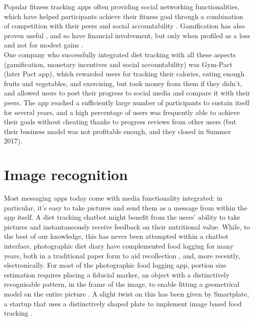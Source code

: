 Popular fitness tracking apps often providing social networking functionalities, which have helped participants achieve their fitness goal through a combination of competition with their peers and social accountability \cite{chenchen2014}. Gamification has also proven useful \cite{doi:10.1001/jamainternmed.2017.3458}, and so have financial involvement, but only when profiled as a loss and not for modest gains \cite{doi:10.7326/M15-1635}. \\
One company who successfully integrated diet tracking with all these aspects (gamification, monetary incentives and social accountability) was Gym-Pact (later Pact app), which rewarded users for tracking their calories, eating enough fruits and vegetables, and exercising, but took money from them if they didn't, and allowed users to post their progress to social media and compare it with their peers. The app reached a sufficiently large number of participants \cite{nudgingpracticioner} to sustain itself for several years, and a high percentage of users was frequently able to achieve their goals without cheating thanks to progress reviews from other users (but their business model was not profitable enough, and they closed in Summer 2017).

\section{Image recognition}
Most messaging apps today come with media functionality integrated; in particular, it's easy to take pictures and send them as a message from within the app itself. A diet tracking chatbot might benefit from the users' ability to take pictures and instantaneously receive feedback on their nutritional value. While, to the best of our knowledge, this has never been attempted within a chatbot interface, photographic diet diary have complemented food logging for many years, both in a traditional paper form to aid recollection \cite{Higgins2009}, and, more recently, electronically. For most of the photographic food logging app, portion size estimation requires placing a fiducial marker, an object with a distinctively recognisable pattern, in the frame of the image, to enable fitting a geometrical model on the entire picture \cite{Ahmad2016}. A slight twist on this has been given by Smartplate, a startup that uses a distinctively shaped plate to implement image based food tracking \cite{smartplate}.

